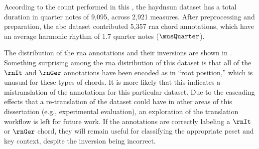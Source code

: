 
According to the count performed in this \thesisdiss{}, the
\gls{haydnsun} dataset has a total duration in quarter notes
of 9,095, across 2,921 measures. After preprocessing and
preparation, the \gls{abc} dataset contributed 5,357
\gls{rna} chord annotations, which have an average harmonic
rhythm of 1.7 quarter notes ($\musQuarter$).

The distribution of the \gls{rna} annotations and their
inversions are shown in .
Something surprising among the \gls{rna} distribution of
this dataset is that all of the $\rnIt$ and $\rnGer$
annotations have been encoded as in ``root position,'' which
is unusual for these types of chords. It is more likely that
this indicates a mistranslation of the annotations for this
particular dataset. Due to the cascading effects that a
re-translation of the dataset could have in other areas of
this dissertation (e.g., experimental evaluation), an
exploration of the translation workflow is left for future
work. If the annotations are correctly labeling a $\rnIt$ or
$\rnGer$ chord, they will remain useful for classifying the
appropriate \gls{pcset} and key context, despite the
inversion being incorrect.




